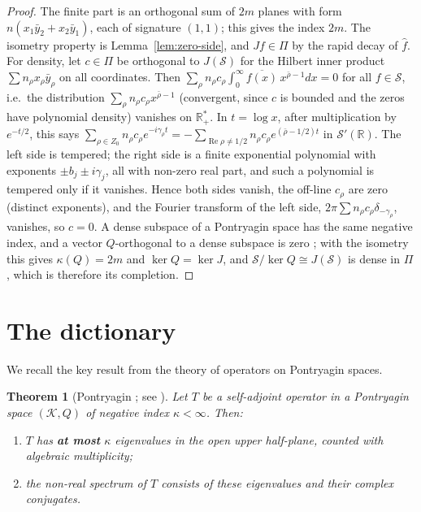 \documentclass[11pt]{amsart}
\newtheorem{theorem}{Theorem}[section]
\renewcommand{\Re}{\operatorname{Re}}
\newcommand{\kap}{\kappa}
\newcommand{\Kcal}{\mathcal{K}}
\newcommand{\Scal}{\mathcal{S}}
\newcommand{\Rp}{\mathbb{R}^*_+}
\begin{document}
\begin{proof}
The finite part is an orthogonal sum of $2m$ planes with form $n(x_1\bar y_2+x_2\bar y_1)$, each of
signature $(1,1)$; this gives the index $2m$.  The isometry property is
Lemma~\ref{lem:zero-side}, and $Jf\in\Pi$ by the rapid decay of $\hat f$.  For density, let
$c\in\Pi$ be orthogonal to $J(\Scal)$ for the Hilbert inner product
$\sum n_\rho x_\rho\bar y_\rho$ on all coordinates.  Then $\sum_\rho n_\rho c_\rho
\int_0^\infty\overline{f(x)}\,x^{\bar\rho-1}dx=0$ for all $f\in\Scal$, i.e.\ the distribution
$\sum_\rho n_\rho c_\rho x^{\bar\rho-1}$ (convergent, since $c$ is bounded and the zeros have
polynomial density) vanishes on $\Rp$.  In $t=\log x$, after multiplication by $e^{-t/2}$, this
says
$\sum_{\rho\in Z_0}n_\rho c_\rho e^{-i\gamma_\rho t}=-\sum_{\Re\rho\ne1/2}n_\rho c_\rho
e^{(\bar\rho-1/2)t}$ in $\mathcal S'(\mathbb R)$.  The left side is tempered; the right side is a
finite exponential polynomial with exponents $\pm b_j\pm i\gamma_j$, all with non-zero real part,
and such a polynomial is tempered only if it vanishes.  Hence both sides vanish, the off-line
$c_\rho$ are zero (distinct exponents), and the Fourier transform of the left side,
$2\pi\sum n_\rho c_\rho\delta_{-\gamma_\rho}$, vanishes, so $c=0$.  A dense subspace of a
Pontryagin space has the same negative index, and a vector $Q$-orthogonal to a dense subspace is
zero \cite{AzizovIokhvidov}; with the isometry this gives $\kap(Q)=2m$ and
$\ker Q=\ker J$, and $\Scal/\ker Q\cong J(\Scal)$ is dense in $\Pi$, which is therefore its
completion.
\end{proof}

\section{The dictionary}
\label{sec:bridge}

We recall the key result from the theory of operators on Pontryagin spaces.

\begin{theorem}[Pontryagin \cite{Pontryagin44}; see \cite{AzizovIokhvidov}]
\label{thm:KL}
Let $T$ be a self-adjoint operator in a Pontryagin space $(\Kcal, Q)$ of negative
index $\kap < \infty$.  Then:
\begin{enumerate}
\item[\emph{(i)}] $T$ has \textbf{at most} $\kap$ eigenvalues in the open upper half-plane,
  counted with algebraic multiplicity;
\item[\emph{(ii)}] the non-real spectrum of $T$ consists of these eigenvalues and their complex
  conjugates.
\end{enumerate}
\end{theorem}
\end{document}
